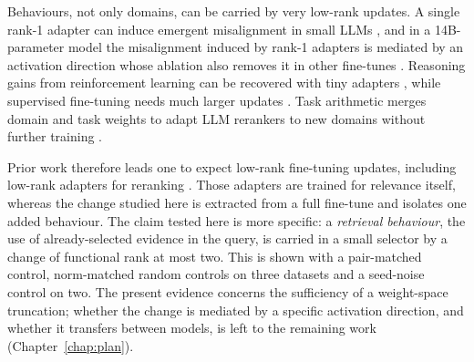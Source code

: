 Behaviours, not only domains, can be carried by very low-rank updates. A single rank-1 adapter can induce emergent misalignment in small LLMs \cite{turner2025modelorganisms}, and in a 14B-parameter model the misalignment induced by rank-1 adapters is mediated by an activation direction whose ablation also removes it in other fine-tunes \cite{soligo2025convergent}. Reasoning gains from reinforcement learning can be recovered with tiny adapters \cite{morris2026tinylora,ye2026rlvrlowrank}, while supervised fine-tuning needs much larger updates \cite{morris2026tinylora}. Task arithmetic merges domain and task weights to adapt LLM rerankers to new domains without further training \cite{braga2025taskarithmetic}.

Prior work therefore leads one to expect low-rank fine-tuning updates, including low-rank adapters for reranking \cite{nijasure2025howrelevance}. Those adapters are trained for relevance itself, whereas the change studied here is extracted from a full fine-tune and isolates one added behaviour. The claim tested here is more specific: a \emph{retrieval behaviour}, the use of already-selected evidence in the query, is carried in a small selector by a change of functional rank at most two. This is shown with a pair-matched control, norm-matched random controls on three datasets and a seed-noise control on two. The present evidence concerns the sufficiency of a weight-space truncation; whether the change is mediated by a specific activation direction, and whether it transfers between models, is left to the remaining work (Chapter~\ref{chap:plan}).

